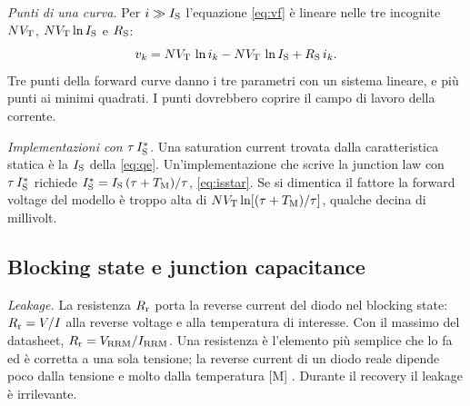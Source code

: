 \documentclass[10pt,a4paper]{scrartcl}
\let\newcommand\pdvaluedefine
\newcommand{\TM}{T_\mathrm{M}}
\newcommand{\IS}{I_\mathrm{S}}
\newcommand{\RS}{R_\mathrm{S}}
\newcommand{\Rr}{R_\mathrm{r}}
\newcommand{\VT}{V_\mathrm{T}}
\newcommand{\Vrrm}{V_\mathrm{RRM}}
\newcommand{\Irrm}{I_\mathrm{RRM}}
\newcommand{\Nem}{N}                          %
\begin{document}
\emph{Punti di una curva.} Per $i \gg \IS$ l'equazione \eqref{eq:vf} è lineare nelle tre incognite $\Nem\VT$, $\Nem\VT\ln\IS$ e $\RS$:
\begin{equation}
v_k = \Nem\VT\,\ln i_k - \Nem\VT\,\ln\IS + \RS\, i_k .
\label{eq:points}
\end{equation}
Tre punti della forward curve danno i tre parametri con un sistema lineare, e più punti ai minimi quadrati. I punti dovrebbero coprire il campo di lavoro della corrente.

\emph{Implementazioni con $\tau\,\IS^{*}$.} Una saturation current trovata dalla caratteristica statica è la $\IS$ della \eqref{eq:qe}. Un'implementazione che scrive la junction law con $\tau\,\IS^{*}$ richiede $\IS^{*} = \IS\,(\tau+\TM)/\tau$, \eqref{eq:isstar}. Se si dimentica il fattore la forward voltage del modello è troppo alta di $\Nem\VT\ln[(\tau+\TM)/\tau]$, qualche decina di millivolt.

\subsection{Blocking state e junction capacitance}
\label{sec:blocking}
\emph{Leakage.} La resistenza $\Rr$ porta la reverse current del diodo nel blocking state: $\Rr = V/I$ alla reverse voltage e alla temperatura di interesse. Con il massimo del datasheet, $\Rr = \Vrrm/\Irrm$. Una resistenza è l'elemento più semplice che lo fa ed è corretta a una sola tensione; la reverse current di un diodo reale dipende poco dalla tensione e molto dalla temperatura [M] \cite{lutz}. Durante il recovery il leakage è irrilevante.
\end{document}
